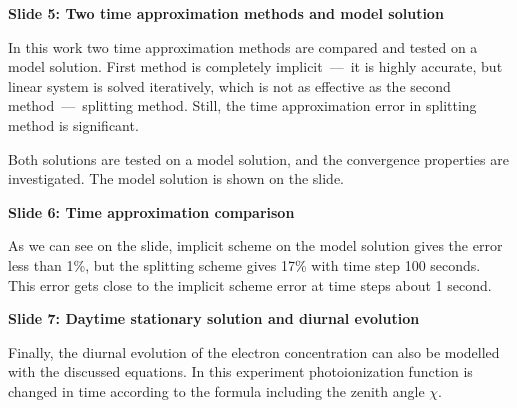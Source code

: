 \documentclass[2pt, a4paper, fleqn]{extarticle}
\begin{document}
{\bf Slide 5: Two time approximation methods and model solution}

In this work two time approximation methods are compared and tested on a model solution. First method is completely implicit~---~it is highly accurate, but linear system is solved iteratively, which is not as effective as the second method~---~splitting method. Still, the time approximation error in splitting method is significant.

Both solutions are tested on a model solution, and the convergence properties are investigated. The model solution is shown on the slide.

\medskip

{\bf Slide 6: Time approximation comparison}

As we can see on the slide, implicit scheme on the model solution gives the error less than 1\%, but the splitting scheme gives 17\% with time step 100 seconds. This error gets close to the implicit scheme error at time steps about 1 second.

\medskip

{\bf Slide 7: Daytime stationary solution and diurnal evolution}

Finally, the diurnal evolution of the electron concentration can also be modelled with the discussed equations. In this experiment photoionization function is changed in time according to the formula including the zenith angle $\chi$.
\end{document}
